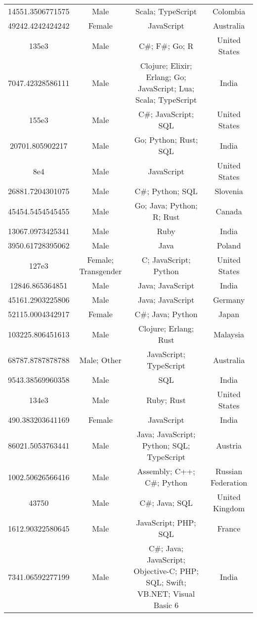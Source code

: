 \begin{center}
\begin{tabular}{ |c|c|c|c| }
14551.3506771575  &  Male  &  Scala; TypeScript  &  Colombia  \\ 
49242.4242424242  &  Female  &  JavaScript  &  Australia  \\ 
135e3  &  Male  &  C\#; F\#; Go; R  &  United States  \\ 
7047.42328586111  &  Male  &  Clojure; Elixir; Erlang; Go; JavaScript; Lua; Scala; TypeScript  &  India  \\ 
155e3  &  Male  &  C\#; JavaScript; SQL  &  United States  \\ 
20701.805902217  &  Male  &  Go; Python; Rust; SQL  &  India  \\ 
8e4  &  Male  &  JavaScript  &  United States  \\ 
26881.7204301075  &  Male  &  C\#; Python; SQL  &  Slovenia  \\ 
45454.5454545455  &  Male  &  Go; Java; Python; R; Rust  &  Canada  \\ 
13067.0973425341  &  Male  &  Ruby  &  India  \\ 
3950.61728395062  &  Male  &  Java  &  Poland  \\ 
127e3  &  Female; Transgender  &  C; JavaScript; Python  &  United States  \\ 
12846.865364851  &  Male  &  Java; JavaScript  &  India  \\ 
45161.2903225806  &  Male  &  Java; JavaScript  &  Germany  \\ 
52115.0004342917  &  Female  &  C\#; Java; Python  &  Japan  \\ 
103225.806451613  &  Male  &  Clojure; Erlang; Rust  &  Malaysia  \\ 
68787.8787878788  &  Male; Other  &  JavaScript; TypeScript  &  Australia  \\ 
9543.38569960358  &  Male  &  SQL  &  India  \\ 
134e3  &  Male  &  Ruby; Rust  &  United States  \\ 
490.383203641169  &  Female  &  JavaScript  &  India  \\ 
86021.5053763441  &  Male  &  Java; JavaScript; Python; SQL; TypeScript  &  Austria  \\ 
1002.50626566416  &  Male  &  Assembly; C++; C\#; Python  &  Russian Federation  \\ 
43750  &  Male  &  C\#; Java; SQL  &  United Kingdom  \\ 
1612.90322580645  &  Male  &  JavaScript; PHP; SQL  &  France  \\ 
7341.06592277199  &  Male  &  C\#; Java; JavaScript; Objective-C; PHP; SQL; Swift; VB.NET; Visual Basic 6  &  India  \\ 

\end{tabular}
\end{center}
